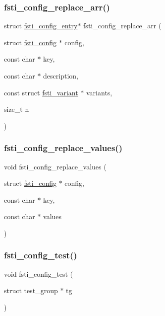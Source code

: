\subsubsection{\texorpdfstring{fsti\+\_\+config\+\_\+replace\+\_\+arr()}{fsti\_config\_replace\_arr()}}
{\footnotesize\ttfamily struct \mbox{\hyperlink{structfsti__config__entry}{fsti\+\_\+config\+\_\+entry}}$\ast$ fsti\+\_\+config\+\_\+replace\+\_\+arr (\begin{DoxyParamCaption}\item[{struct \mbox{\hyperlink{structfsti__config}{fsti\+\_\+config}} $\ast$}]{config,  }\item[{const char $\ast$}]{key,  }\item[{const char $\ast$}]{description,  }\item[{const struct \mbox{\hyperlink{structfsti__variant}{fsti\+\_\+variant}} $\ast$}]{variants,  }\item[{size\+\_\+t}]{n }\end{DoxyParamCaption})}

\mbox{\label{fsti-config_8h_ad11a9e59945cf4619a85164441ea5fd8}} 
\subsubsection{\texorpdfstring{fsti\+\_\+config\+\_\+replace\+\_\+values()}{fsti\_config\_replace\_values()}}
{\footnotesize\ttfamily void fsti\+\_\+config\+\_\+replace\+\_\+values (\begin{DoxyParamCaption}\item[{struct \mbox{\hyperlink{structfsti__config}{fsti\+\_\+config}} $\ast$}]{config,  }\item[{const char $\ast$}]{key,  }\item[{const char $\ast$}]{values }\end{DoxyParamCaption})}

\mbox{\label{fsti-config_8h_a56851785b4dd54466e2d92ef3d55fc2f}} 
\subsubsection{\texorpdfstring{fsti\+\_\+config\+\_\+test()}{fsti\_config\_test()}}
{\footnotesize\ttfamily void fsti\+\_\+config\+\_\+test (\begin{DoxyParamCaption}\item[{struct test\+\_\+group $\ast$}]{tg }\end{DoxyParamCaption})}

